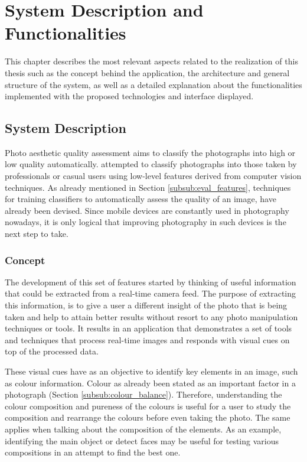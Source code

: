 
\chapter{System Description and Functionalities}
\label{cha:system}


This chapter describes the most relevant aspects related to the realization of this thesis such as the concept behind the application, the architecture and general structure of the system, as well as a detailed explanation about the functionalities implemented with the proposed technologies and interface displayed.

\section{System Description}
\label{sec:system_description}

Photo aesthetic quality assessment aims to classify the photographs into high or low quality automatically. \citeauthor{tong2005classification} \cite{tong2005classification} attempted to classify photographs into those taken by professionals or casual users using low-level features derived from computer vision techniques. As already mentioned in Section \ref{subsub:eval_features}, techniques for training classifiers to automatically assess the quality of an image, have already been devised. Since mobile devices are constantly used in photography nowadays, it is only logical that improving photography in such devices is the next step to take.

\subsection{Concept}
The development of this set of features started by thinking of useful information that could be extracted from a real-time camera feed. The purpose of extracting this information, is to give a user a different insight of the photo that is being taken and help to attain better results without resort to any photo manipulation techniques or tools. It results in an application that demonstrates a set of tools and techniques that process real-time images and responds with visual cues on top of the processed data.

These visual cues have as an objective to identify key elements in an image, such as colour information. Colour as already been stated as an important factor in a photograph (Section \ref{subsub:colour_balance}). Therefore, understanding the colour composition and pureness of the colours is useful for a user to study the composition and rearrange the colours before even taking the photo. The same applies when talking about the composition of the elements. As an example, identifying the main object or detect faces may be useful for testing various compositions in an attempt to find the best one.

